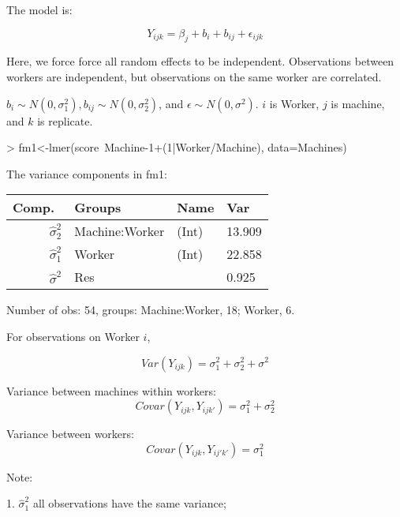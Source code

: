 \documentclass[12pt]{amsart}
\begin{document}
The model is:

\begin{equation}
Y_{ijk} = \beta_j + b_i + b_{ij} + \epsilon_{ijk}
\end{equation}

Here, we force force all random effects to be independent.
Observations between workers are independent, but observations on the same worker are correlated.

$b_i \sim N(0,\sigma_1^2), b_{ij} \sim N(0,\sigma_2^2)$, and $\epsilon\sim N(0,\sigma^2)$. $i$ is Worker, $j$ is machine, and $k$ is replicate.  

\begin{Schunk}
\begin{Sinput}
> fm1<-lmer(score~Machine-1+(1|Worker/Machine),
   data=Machines)
\end{Sinput}
\end{Schunk}

The variance components in fm1:

\small
\begin{tabular}{rlll}
  \hline
Comp.\ & Groups & Name & Var\\ 
  \hline
$\hat{\sigma}_2^2$ & Machine:Worker & (Int) & 13.909  \\ 
$\hat{\sigma}_1^2$  & Worker & (Int) & 22.858  \\ 
$\hat{\sigma}^2$& Res &  &  0.925 \\ 
   \hline
\end{tabular}

Number of obs: 54, groups: Machine:Worker, 18; Worker, 6.

\normalsize

For observations on Worker $i$, 

\begin{equation}
Var(Y_{ijk})= \sigma_1^2 + \sigma_2^2 + \sigma^2 
\end{equation}

Variance between machines within workers:
\begin{equation}
Covar(Y_{ijk},Y_{ijk'})= \sigma_1^2 + \sigma_2^2
\end{equation}

Variance between workers:
\begin{equation}
Covar(Y_{ijk},Y_{ij'k'})= \sigma_1^2
\end{equation}

Note:

1. $\hat{\sigma}_1^2$ all observations have the same variance;
\end{document}
